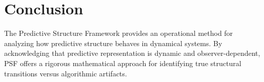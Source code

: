 \section{Conclusion}
The Predictive Structure Framework provides an operational method for analyzing how predictive structure behaves in dynamical systems. By acknowledging that predictive representation is dynamic and observer-dependent, PSF offers a rigorous mathematical approach for identifying true structural transitions versus algorithmic artifacts.
